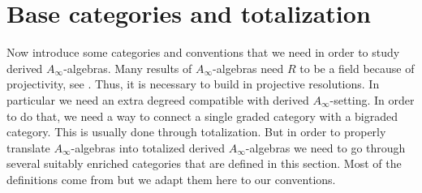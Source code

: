\documentclass[Thesis.tex]{subfiles}
\begin{document}





\section{Base categories and totalization}\label{categories}




Now introduce some categories and conventions that we need in order to study derived $A_\infty$-algebras. Many results of $A_\infty$-algebras need $R$ to be a field because of projectivity, see . Thus, it is necessary to build in projective resolutions. In particular we need an extra degreed compatible with derived $A_\infty$-setting. In order to do that, we need a way to connect a single graded category with a bigraded category. This is usually done through totalization. But in order to properly translate $A_\infty$-algebras into totalized derived $A_\infty$-algebras we need to go through several suitably enriched categories that are defined in this section. Most of the definitions come from \cite[\S 2]{whitehouse} but we adapt them here to our conventions.
\end{document}
